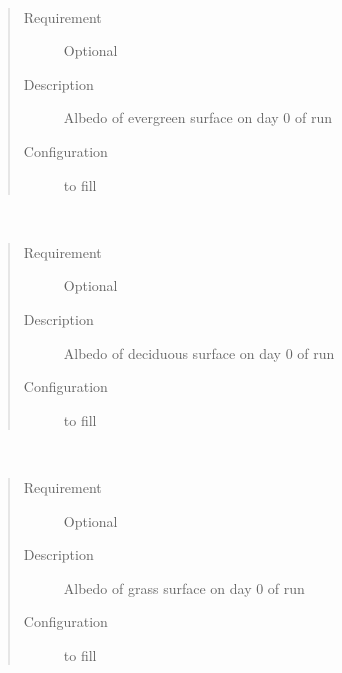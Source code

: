 \documentclass[letterpaper,10pt,english]{sphinxmanual}
\begin{document}
\begin{fulllineitems}
\label{\detokenize{input_files/Initial_Conditions/Vegetation_parameters:cmdoption-arg-albevetr0}}~\begin{quote}\begin{description}
\item[{Requirement}] \leavevmode
Optional

\item[{Description}] \leavevmode
Albedo of evergreen surface on day 0 of run

\item[{Configuration}] \leavevmode
to fill

\end{description}\end{quote}

\end{fulllineitems}


\begin{fulllineitems}
\label{\detokenize{input_files/Initial_Conditions/Vegetation_parameters:cmdoption-arg-albdectr0}}~\begin{quote}\begin{description}
\item[{Requirement}] \leavevmode
Optional

\item[{Description}] \leavevmode
Albedo of deciduous surface on day 0 of run

\item[{Configuration}] \leavevmode
to fill

\end{description}\end{quote}

\end{fulllineitems}


\begin{fulllineitems}
\label{\detokenize{input_files/Initial_Conditions/Vegetation_parameters:cmdoption-arg-albgrass0}}~\begin{quote}\begin{description}
\item[{Requirement}] \leavevmode
Optional

\item[{Description}] \leavevmode
Albedo of grass surface on day 0 of run

\item[{Configuration}] \leavevmode
to fill

\end{description}\end{quote}

\end{fulllineitems}
\end{document}

